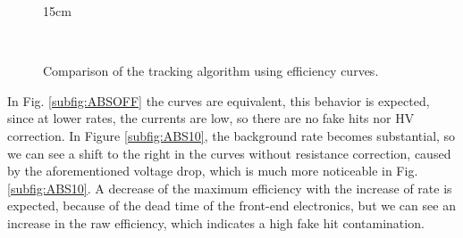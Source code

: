 \begin{figure}[!htm]{15cm}
  \caption{Comparison of the tracking algorithm using efficiency curves.} 
  \label{fig:effcomparison}
  \hfill
    \hfill
  \\
\end{figure}

In Fig. \ref{subfig:ABSOFF} the curves are equivalent, this behavior is expected, since at lower rates, the currents are low, so there are no fake hits nor HV correction. In Figure \ref{subfig:ABS10}, the background rate becomes substantial, so we can see a shift to the right in the curves without resistance correction, caused by the aforementioned voltage drop, which is much more noticeable in Fig. \ref{subfig:ABS10}. A decrease of the maximum efficiency with the increase of rate is expected, because of the dead time of the front-end electronics, but we can see an increase in the raw efficiency, which indicates a high fake hit contamination.

